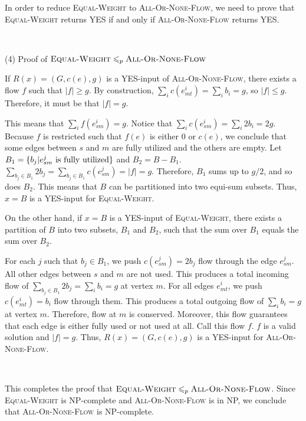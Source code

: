 \documentclass{article}
\begin{document}
In order to reduce \textsc{Equal-Weight} to \textsc{All-Or-None-Flow}, we need to prove that \textsc{Equal-Weight} returns YES if and only if \textsc{All-Or-None-Flow} returns YES.

~

\noindent(4) Proof of $\textsc{Equal-Weight}\leqslant_p\textsc{All-Or-None-Flow}$

If $R(x)=(G,c(e),g)$ is a YES-input of \textsc{All-Or-None-Flow}, there exists a flow $f$ such that $|f|\geqslant g$. By construction, $\sum_ic(e_{mt}^i)=\sum_ib_i=g$, so $|f|\leqslant g$. Therefore, it must be that $|f|=g$.

This means that $\sum_if(e_{sm}^i)=g$. Notice that $\sum_ic(e_{sm}^i)=\sum_i2b_i=2g$. Because $f$ is restricted such that $f(e)$ is either 0 or $c(e)$, we conclude that some edges between $s$ and $m$ are fully utilized and the others are empty. Let $B_1=\{b_j|e_{sm}^j\textup{ is fully utilized}\}$ and $B_2=B-B_1$. $\sum_{b_j\in B_1}2b_j=\sum_{b_j\in B_1}c(e_{sm}^j)=|f|=g$. Therefore, $B_1$ sums up to $g/2$, and so does $B_2$. This means that $B$ can be partitioned into two equi-sum subsets. Thus, $x=B$ is a YES-input for \textsc{Equal-Weight}.

On the other hand, if $x=B$ is a YES-input of \textsc{Equal-Weight}, there exists a partition of $B$ into two subsets, $B_1$ and $B_2$, such that the sum over $B_1$ equals the sum over $B_2$.

For each $j$ such that $b_j\in B_1$, we push $c(e_{sm}^j)=2b_j$ flow through the edge $e_{sm}^j$. All other edges between $s$ and $m$ are not used. This produces a total incoming flow of $\sum_{b_j\in B_1}2b_j=\sum_ib_i=g$ at vertex $m$. For all edges $e_{mt}^i$, we push $c(e_{mt}^i)=b_i$ flow through them. This produces a total outgoing flow of $\sum_ib_i=g$ at vertex $m$. Therefore, flow at $m$ is conserved. Moreover, this flow guarantees that each edge is either fully used or not used at all. Call this flow $f$. $f$ is a valid solution and $|f|=g$. Thus, $R(x)=(G,c(e),g)$ is a YES-input for \textsc{All-Or-None-Flow}.

~

This completes the proof that $\textsc{Equal-Weight}\leqslant_p\textsc{All-Or-None-Flow}$. Since \textsc{Equal-Weight} is NP-complete and \textsc{All-Or-None-Flow} is in NP, we conclude that \textsc{All-Or-None-Flow} is NP-complete.
\end{document}
